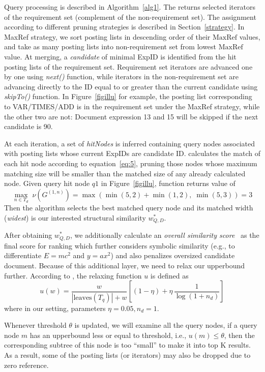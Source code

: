 \documentclass[runningheads]{llncs}
\begin{document}
Query processing is described in Algorithm~\ref{alg1}.
The  returns selected iterators of the requirement set (complement of the non-requirement set).
The assignment according to different pruning strategies is described in Section~\ref{strategy}.
%
In MaxRef strategy, we sort posting lists in descending order of their $\text{MaxRef}$ values, and take as many posting lists into non-requirement set from lowest $\text{MaxRef}$ value.
At merging, a \textit{candidate} of minimal ExpID is identified from the hit posting lists of the requirement set.
Requirement set iterators are advanced one by one using \textit{next()} function, while iterators in the non-requirement set are advancing directly to the ID equal to or greater than the current candidate using \textit{skipTo()} function. In Figure~\ref{figillu} for example, the posting list corresponding to VAR/TIMES/ADD is in the requirement set under the MaxRef strategy, while the other two are not: Document expression 13 and 15 will be skipped if the next candidate is 90.

At each iteration, a set of \textit{hitNodes} is inferred containing query nodes associated with posting lists whose current ExpIDs are candidate ID.
 calculates the match of each hit node according to equation~\ref{eq:5}, pruning those nodes whose maximum matching size will be smaller than the matched size of any already calculated node.
%
Given query hit node $q1$ in Figure~\ref{figillu}, function  returns value of
$$\max_{n\in T_d}\;\nu(G^{(1, n)}) = \max(\min(5, 2) + \min(1, 2),\; \min(5, 3)) = 3$$
Then the algorithm selects the best matched query node and its matched width (\emph{widest}) is our interested structural similarity $w^*_{Q, D}$.

After obtaining $w^*_{Q, D}$, we additionally calculate an \emph{overall similarity score}~\cite{a0_2019} as the final score for ranking which further considers symbolic similarity (e.g., to differentiate $E=mc^2$ and $y=ax^2$) and also penalizes oversized candidate document.
Because of this additional layer, we need to relax our upperbound further.
According to \cite{a0_2019}, the relaxing function $u$ is defined as
\begin{equation}
u(w) = \frac{w}{|\text{leaves}(T_q)| + w} \left[ (1 - \eta) + \eta \, \frac 1 {\log (1 + n_d)} \right]
\end{equation}
where in our setting,  parameters $\eta = 0.05, n_d = 1$.

Whenever threshold $\theta$ is updated, we will examine all the query nodes, if a query node $m$ has an upperbound less or equal to threshold, i.e., $u(m) \le \theta$, then the corresponding subtree of this node is too ``small'' to make it into top K results. As a result, some of the posting lists (or iterators) may also be dropped due to zero reference.
\end{document}
